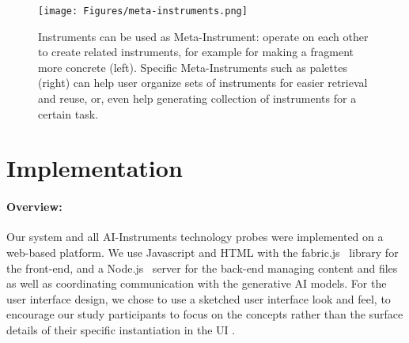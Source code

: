 \begin{figure*}
    \centering
    \texttt{[image: Figures/meta-instruments.png]}
    \caption{Instruments can be used as Meta-Instrument: operate on each other to create related instruments, for example for making a fragment more concrete (left). Specific Meta-Instruments such as palettes (right) can help user organize sets of instruments for easier retrieval and reuse, or, even help generating collection of instruments for a certain task.}
    \label{fig:meta-instrument}
\end{figure*}








\section{Implementation}


\paragraph{Overview:}
Our system and all AI-Instruments technology probes were implemented on a web-based platform. We use Javascript and HTML with the fabric.js~\cite{juriy_zaytsev_fabricjs_2024} library for the front-end, and a Node.js~\cite{openjs_foundation_nodejs_2024} server for the back-end managing content and files as well as coordinating communication  with the generative AI models. For the user interface design, we chose to use a sketched user interface look and feel, to encourage our study participants to focus on the concepts rather than the surface details of their specific instantiation in the UI \cite{BuxtonSketchingUserExperiences2007}.  

